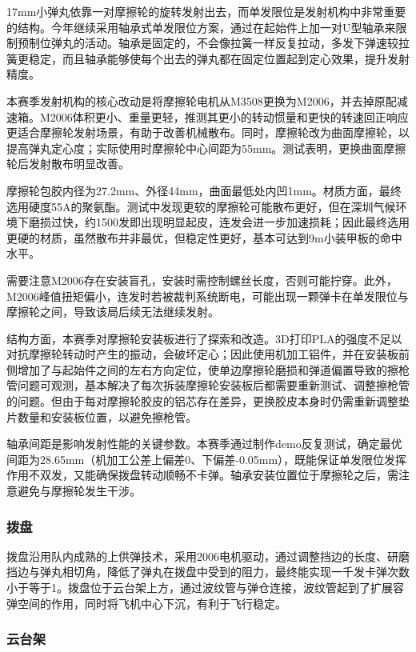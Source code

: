 17mm小弹丸依靠一对摩擦轮的旋转发射出去，而单发限位是发射机构中非常重要的结构。今年继续采用轴承式单发限位方案，通过在起始件上加一对U型轴承来限制预制位弹丸的活动。轴承是固定的，不会像拉簧一样反复拉动，多发下弹速较拉簧更稳定，而且轴承能够使每个出去的弹丸都在固定位置起到定心效果，提升发射精度。

本赛季发射机构的核心改动是将摩擦轮电机从M3508更换为M2006，并去掉原配减速箱。M2006体积更小、重量更轻，推测其更小的转动惯量和更快的转速回正响应更适合摩擦轮发射场景，有助于改善机械散布。同时，摩擦轮改为曲面摩擦轮，以提高弹丸定心度；实际使用时摩擦轮中心间距为55mm。测试表明，更换曲面摩擦轮后发射散布明显改善。

摩擦轮包胶内径为27.2mm、外径44mm，曲面最低处内凹1mm。材质方面，最终选用硬度55A的聚氨酯。测试中发现更软的摩擦轮可能散布更好，但在深圳气候环境下磨损过快，约1500发即出现明显起皮，连发会进一步加速损耗；因此最终选用更硬的材质，虽然散布并非最优，但稳定性更好，基本可达到9m小装甲板的命中水平。

需要注意M2006存在安装盲孔，安装时需控制螺丝长度，否则可能拧穿。此外，M2006峰值扭矩偏小，连发时若被裁判系统断电，可能出现一颗弹卡在单发限位与摩擦轮之间，导致该局后续无法继续发射。

结构方面，本赛季对摩擦轮安装板进行了探索和改造。3D打印PLA的强度不足以对抗摩擦轮转动时产生的振动，会破坏定心；因此使用机加工铝件，并在安装板前侧增加了与起始件之间的左右方向定位，使单边摩擦轮磨损和弹道偏置导致的擦枪管问题可观测，基本解决了每次拆装摩擦轮安装板后都需要重新测试、调整擦枪管的问题。但由于每对摩擦轮胶皮的铝芯存在差异，更换胶皮本身时仍需重新调整垫片数量和安装板位置，以避免擦枪管。

轴承间距是影响发射性能的关键参数。本赛季通过制作demo反复测试，确定最优间距为28.65mm（机加工公差上偏差0、下偏差-0.05mm），既能保证单发限位发挥作用不双发，又能确保拨盘转动顺畅不卡弹。轴承安装位置位于摩擦轮之后，需注意避免与摩擦轮发生干涉。

\subsubsection{拨盘}

拨盘沿用队内成熟的上供弹技术，采用2006电机驱动，通过调整挡边的长度、研磨挡边与弹丸相切角，降低了弹丸在拨盘中受到的阻力，最终能实现一千发卡弹次数小于等于1。拨盘位于云台架上方，通过波纹管与弹仓连接，波纹管起到了扩展容弹空间的作用，同时将飞机中心下沉，有利于飞行稳定。

\subsubsection{云台架}

